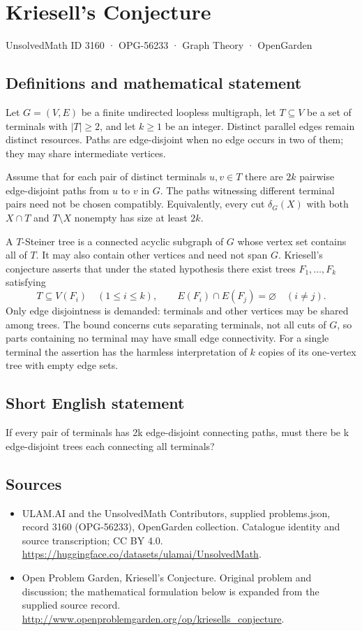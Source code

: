 \documentclass[11pt,a4paper]{article}
\begin{document}
\section*{Kriesell's Conjecture}\label{3160}
{\small UnsolvedMath ID 3160 · OPG-56233 · Graph Theory · OpenGarden}
\subsection{Definitions and mathematical statement}
Let $G=(V,E)$ be a finite undirected loopless multigraph, let
$T\subseteq V$ be a set of terminals with $|T|\geq2$, and let
$k\geq1$ be an integer. Distinct parallel edges remain distinct
resources. Paths are edge-disjoint when no edge occurs in two
of them; they may share intermediate vertices.

Assume that for each pair of distinct terminals $u,v\in T$
there are $2k$ pairwise edge-disjoint paths from $u$ to $v$ in
$G$. The paths witnessing different terminal pairs need not be
chosen compatibly. Equivalently, every cut $\delta_G(X)$ with
both $X\cap T$ and $T\setminus X$ nonempty has size at least
$2k$.

A $T$-Steiner tree is a connected acyclic subgraph of $G$ whose
vertex set contains all of $T$. It may also contain other
vertices and need not span $G$. Kriesell's conjecture asserts
that under the stated hypothesis there exist trees
$F_1,\ldots,F_k$ satisfying
\[
 T\subseteq V(F_i)\quad(1\leq i\leq k),\qquad
 E(F_i)\cap E(F_j)=\varnothing\quad(i\neq j).
\]
Only edge disjointness is demanded: terminals and other vertices
may be shared among trees. The bound concerns cuts separating
terminals, not all cuts of $G$, so parts containing no terminal
may have small edge connectivity. For a single terminal the
assertion has the harmless interpretation of $k$ copies of its
one-vertex tree with empty edge sets.
\subsection{Short English statement}
If every pair of terminals has 2k edge-disjoint connecting paths, must there be k edge-disjoint trees each connecting all terminals?
\subsection{Sources}
\begin{itemize}
\item[S1] ULAM.AI and the UnsolvedMath Contributors, supplied problems.json, record 3160 (OPG-56233), OpenGarden collection. Catalogue identity and source transcription; CC BY 4.0.
\url{https://huggingface.co/datasets/ulamai/UnsolvedMath}.
\item[S2] Open Problem Garden, Kriesell's Conjecture. Original problem and discussion; the mathematical formulation below is expanded from the supplied source record.
\url{http://www.openproblemgarden.org/op/kriesells_conjecture}.
\end{itemize}
\end{document}
